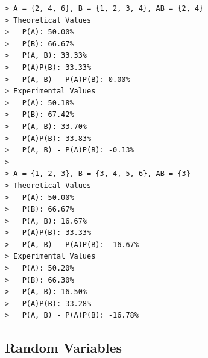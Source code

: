 \documentclass{article}
\begin{document}
\begin{enumerate}
\begin{itemize}
\begin{verbatim}
> A = {2, 4, 6}, B = {1, 2, 3, 4}, AB = {2, 4}
> Theoretical Values
> 	P(A): 50.00%
> 	P(B): 66.67%
> 	P(A, B): 33.33%
> 	P(A)P(B): 33.33%
> 	P(A, B) - P(A)P(B): 0.00%
> Experimental Values
> 	P(A): 50.18%
> 	P(B): 67.42%
> 	P(A, B): 33.70%
> 	P(A)P(B): 33.83%
> 	P(A, B) - P(A)P(B): -0.13%
> 
> A = {1, 2, 3}, B = {3, 4, 5, 6}, AB = {3}
> Theoretical Values
> 	P(A): 50.00%
> 	P(B): 66.67%
> 	P(A, B): 16.67%
> 	P(A)P(B): 33.33%
> 	P(A, B) - P(A)P(B): -16.67%
> Experimental Values
> 	P(A): 50.20%
> 	P(B): 66.30%
> 	P(A, B): 16.50%
> 	P(A)P(B): 33.28%
> 	P(A, B) - P(A)P(B): -16.78%
\end{verbatim}
		\end{itemize}
\end{enumerate}

\subsection{Random Variables}
\end{document}
